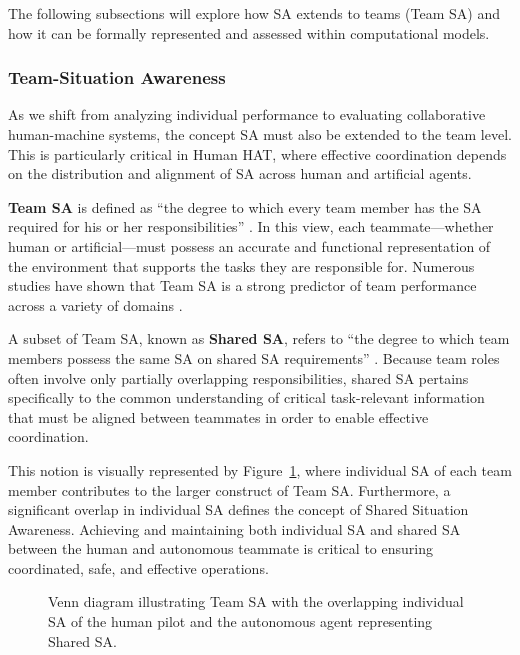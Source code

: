 \documentclass[12pt,a4paper]{article} %
\begin{document}
	The following subsections will explore how SA extends to teams (Team SA) and how it can be formally represented and assessed within computational models.

	\subsubsection{Team-Situation Awareness}

	As we shift from analyzing individual performance to evaluating collaborative human-machine systems, the concept SA must also be extended to the team level. This is particularly critical in Human HAT, where effective coordination depends on the distribution and alignment of SA across human and artificial agents.

	\textbf{Team SA} is defined as “the degree to which every team member has the SA required for his or her responsibilities” \parencite{endsley_measurement_1995}. In this view, each teammate—whether human or artificial—must possess an accurate and functional representation of the environment that supports the tasks they are responsible for. Numerous studies have shown that Team SA is a strong predictor of team performance across a variety of domains \parencite{cooke_measuring_2001,prince_measurement_2007,parush_individuals_2017}.

	A subset of Team SA, known as \textbf{Shared SA}, refers to “the degree to which team members possess the same SA on shared SA requirements” \parencite{endsley_designing_2003}. Because team roles often involve only partially overlapping responsibilities, shared SA pertains specifically to the common understanding of critical task-relevant information that must be aligned between teammates in order to enable effective coordination.

	This notion is visually represented by Figure~\ref{fig:team-sa-venn}, where individual SA of each team member contributes to the larger construct of Team SA. Furthermore, a significant overlap in individual SA defines the concept of Shared Situation Awareness. Achieving and maintaining both individual SA and shared SA between the human and autonomous teammate is critical to ensuring coordinated, safe, and effective operations.

	\begin{figure}[h!]
		\centering
		\caption{Venn diagram illustrating Team SA with the overlapping individual SA of the human pilot and the autonomous agent representing Shared SA.}
		\label{fig:team-sa-venn}
	\end{figure}
\end{document}
